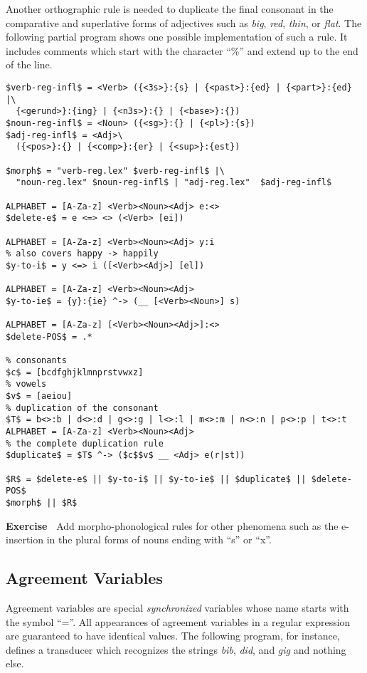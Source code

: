 \documentclass[11pt]{article}
\newenvironment{exercise}{

  \hrulefill\nopagebreak

  \textbf{Exercise~}}
{

  \nopagebreak\hrulefill\vspace{0.2cm}

}
\begin{document}
Another orthographic rule is needed to duplicate the final
consonant in the comparative and superlative forms of adjectives such
as \emph{big}, \emph{red}, \emph{thin}, or \emph{flat}. The following
partial program shows one possible implementation of such a rule. It
includes comments which start with the character ``\%'' and extend up
to the end of the line.

\begin{verbatim}
$verb-reg-infl$ = <Verb> ({<3s>}:{s} | {<past>}:{ed} | {<part>}:{ed} |\
  {<gerund>}:{ing} | {<n3s>}:{} | {<base>}:{})
$noun-reg-infl$ = <Noun> ({<sg>}:{} | {<pl>}:{s})
$adj-reg-infl$ = <Adj>\
  ({<pos>}:{} | {<comp>}:{er} | {<sup>}:{est})

$morph$ = "verb-reg.lex" $verb-reg-infl$ |\
  "noun-reg.lex" $noun-reg-infl$ | "adj-reg.lex"  $adj-reg-infl$

ALPHABET = [A-Za-z] <Verb><Noun><Adj> e:<>
$delete-e$ = e <=> <> (<Verb> [ei])

ALPHABET = [A-Za-z] <Verb><Noun><Adj> y:i
% also covers happy -> happily
$y-to-i$ = y <=> i ([<Verb><Adj>] [el])

ALPHABET = [A-Za-z] <Verb><Noun><Adj>
$y-to-ie$ = {y}:{ie} ^-> (__ [<Verb><Noun>] s)

ALPHABET = [A-Za-z] [<Verb><Noun><Adj>]:<>
$delete-POS$ = .*

% consonants
$c$ = [bcdfghjklmnprstvwxz]
% vowels
$v$ = [aeiou]
% duplication of the consonant
$T$ = b<>:b | d<>:d | g<>:g | l<>:l | m<>:m | n<>:n | p<>:p | t<>:t
ALPHABET = [A-Za-z] <Verb><Noun><Adj>
% the complete duplication rule
$duplicate$ = $T$ ^-> ($c$$v$ __ <Adj> e(r|st))

$R$ = $delete-e$ || $y-to-i$ || $y-to-ie$ || $duplicate$ || $delete-POS$
$morph$ || $R$
\end{verbatim}

\begin{exercise}
  Add morpho-phonological rules for other phenomena such as the
  e-insertion in the plural forms of nouns ending with ``s'' or ``x''.
\end{exercise}

\subsection{Agreement Variables}

Agreement variables are special \emph{synchronized} variables whose name
starts with the symbol ``=''. All appearances of agreement variables
in a regular expression are guaranteed to have identical values. The
following program, for instance, defines a transducer which recognizes
the strings \emph{bib}, \emph{did}, and \emph{gig} and nothing else.
\end{document}
